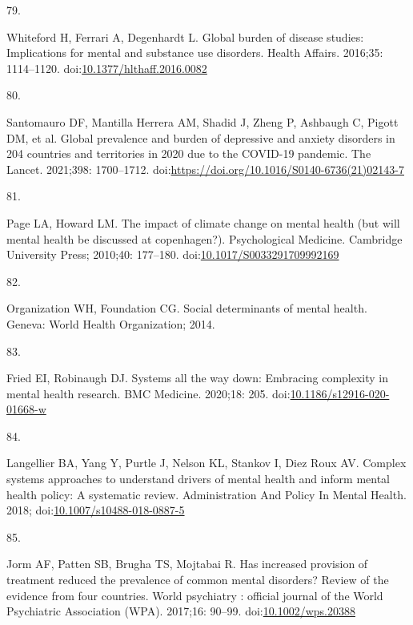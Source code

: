\documentclass[
]{article}
\newlength{\cslhangindent}
\newlength{\csllabelwidth}
\newlength{\cslentryspacingunit} %
\newenvironment{CSLReferences}[2] %
 {%
  \setlength{\parindent}{0pt}
  \ifodd #1
  \let\oldpar\par
  \def\par{\hangindent=\cslhangindent\oldpar}
  \fi
  \setlength{\parskip}{#2\cslentryspacingunit}
 }%
 {}
\newcommand{\CSLLeftMargin}[1]{\parbox[t]{\csllabelwidth}{#1}}
\newcommand{\CSLRightInline}[1]{\parbox[t]{\linewidth - \csllabelwidth}{#1}\break}
\begin{document}
\begin{CSLReferences}{0}{0}
\leavevmode{}%
\CSLLeftMargin{79. }%
\CSLRightInline{Whiteford H, Ferrari A, Degenhardt L. Global burden of disease studies: Implications for mental and substance use disorders. Health Affairs. 2016;35: 1114--1120. doi:\href{https://doi.org/10.1377/hlthaff.2016.0082}{10.1377/hlthaff.2016.0082}}

\leavevmode{}%
\CSLLeftMargin{80. }%
\CSLRightInline{Santomauro DF, Mantilla Herrera AM, Shadid J, Zheng P, Ashbaugh C, Pigott DM, et al. Global prevalence and burden of depressive and anxiety disorders in 204 countries and territories in 2020 due to the COVID-19 pandemic. The Lancet. 2021;398: 1700--1712. doi:\url{https://doi.org/10.1016/S0140-6736(21)02143-7}}

\leavevmode{}%
\CSLLeftMargin{81. }%
\CSLRightInline{Page LA, Howard LM. The impact of climate change on mental health (but will mental health be discussed at copenhagen?). Psychological Medicine. Cambridge University Press; 2010;40: 177--180. doi:\href{https://doi.org/10.1017/S0033291709992169}{10.1017/S0033291709992169}}

\leavevmode{}%
\CSLLeftMargin{82. }%
\CSLRightInline{Organization WH, Foundation CG. Social determinants of mental health. Geneva: World Health Organization; 2014. }

\leavevmode{}%
\CSLLeftMargin{83. }%
\CSLRightInline{Fried EI, Robinaugh DJ. Systems all the way down: Embracing complexity in mental health research. BMC Medicine. 2020;18: 205. doi:\href{https://doi.org/10.1186/s12916-020-01668-w}{10.1186/s12916-020-01668-w}}

\leavevmode{}%
\CSLLeftMargin{84. }%
\CSLRightInline{Langellier BA, Yang Y, Purtle J, Nelson KL, Stankov I, Diez Roux AV. Complex systems approaches to understand drivers of mental health and inform mental health policy: A systematic review. Administration And Policy In Mental Health. 2018; doi:\href{https://doi.org/10.1007/s10488-018-0887-5}{10.1007/s10488-018-0887-5}}

\leavevmode{}%
\CSLLeftMargin{85. }%
\CSLRightInline{Jorm AF, Patten SB, Brugha TS, Mojtabai R. Has increased provision of treatment reduced the prevalence of common mental disorders? Review of the evidence from four countries. World psychiatry : official journal of the World Psychiatric Association (WPA). 2017;16: 90--99. doi:\href{https://doi.org/10.1002/wps.20388}{10.1002/wps.20388}}


\end{CSLReferences}
\end{document}
